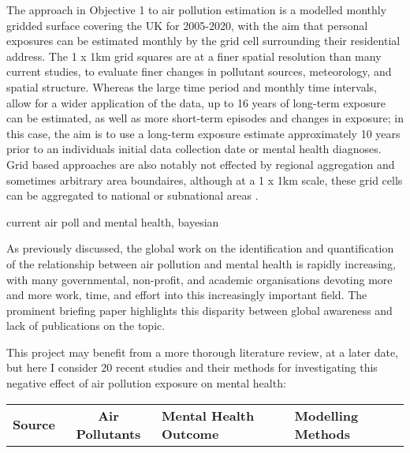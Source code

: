 
The approach in Objective 1 to air pollution estimation is a modelled monthly gridded surface covering the UK for 2005-2020, with the aim that personal exposures can be estimated monthly by the grid cell surrounding their residential address. The 1 x 1km grid squares are at a finer spatial resolution than many current studies, to evaluate finer changes in pollutant sources, meteorology, and spatial structure. Whereas the large time period and monthly time intervals, allow for a wider application of the data, up to 16 years of long-term exposure can be estimated, as well as more short-term episodes and changes in exposure; in this case, the aim is to use a long-term exposure estimate approximately 10 years prior to an individuals initial data collection date or mental health diagnoses. Grid based approaches are also notably not effected by regional aggregation and sometimes arbitrary area boundaires, although at a 1 x 1km scale, these grid cells can be aggregated to national or subnational areas \citep{Anenberg2016SurveyTools}.

current air poll and mental health, bayesian

As previously discussed, the global work on the identification and quantification of the relationship between air pollution and mental health is rapidly increasing, with many governmental, non-profit, and academic organisations devoting more and more work, time, and effort into this increasingly important field. The prominent briefing paper \cite{Lawrance.Emma2021ThePractice} highlights this disparity between global awareness and lack of publications on the topic. 

This project may benefit from a more thorough literature review, at a later date, but here I consider 20 recent studies and their methods for investigating this negative effect of air pollution exposure on mental health:

\begin{landscape}
\begin{longtable}{c c p{4cm} p{6cm}}
\textbf{Source} & \textbf{Air Pollutants} & \textbf{Mental Health Outcome} & \textbf{Modelling Methods} \\



\end{longtable}
\end{landscape}


